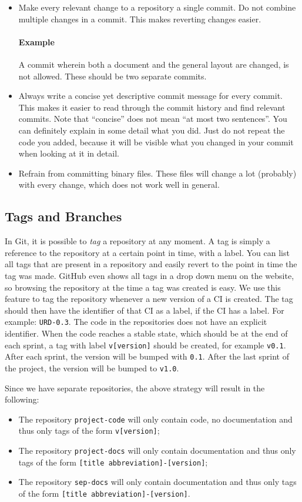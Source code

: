 \begin{itemize}
	\item Make every relevant change to a repository a single commit. Do not combine multiple changes in a commit. This makes reverting changes easier.
	\paragraph{Example} A commit wherein both a document and the general layout are changed, is not allowed. These should be two separate commits.
	
	\item Always write a concise yet descriptive commit message for every commit. This makes it easier to read through the commit history and find relevant commits. Note that ``concise'' does not mean ``at most two sentences''. You can definitely explain in some detail what you did. Just do not repeat the code you added, because it will be visible what you changed in your commit when looking at it in detail.
	
	\item Refrain from committing binary files. These files will change a lot (probably) with every change, which does not work well in general.
\end{itemize}

\subsection{Tags and Branches}
In Git, it is possible to \emph{tag} a repository at any moment. A tag is simply a reference to the repository at a certain point in time, with a label. You can list all tags that are present in a repository and easily revert to the point in time the tag was made. GitHub even shows all tags in a drop down menu on the website, so browsing the repository at the time a tag was created is easy. We use this feature to tag the repository whenever a new version of a CI is created. The tag should then have the identifier of that CI as a label, if the CI has a label. For example: \texttt{URD-0.3}. The code in the repositories does not have an explicit identifier. When the code reaches a stable state, which should be at the end of each sprint, a tag with label \texttt{v[version]} should be created, for example \texttt{v0.1}. After each sprint, the version will be bumped with \texttt{0.1}. After the last sprint of the project, the version will be bumped to \texttt{v1.0}.

Since we have separate repositories, the above strategy will result in the following:
\begin{itemize}
	\item The repository \texttt{project-code} will only contain code, no documentation and thus only tags of the form \texttt{v[version]};
	\item The repository \texttt{project-docs} will only contain documentation and thus only tags of the form \texttt{[title abbreviation]-[version]};
	\item The repository \texttt{sep-docs} will only contain documentation and thus only tags of the form \texttt{[title abbreviation]-[version]}.
\end{itemize}